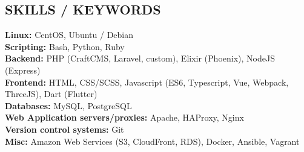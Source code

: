 \documentclass[margin,line]{resume}
\begin{document}
\begin{resume}
    \vspace{-1mm}

\sectionline

    \section{\mysidestyle \textbf{\large{S}\small{KILLS} / \large{K}\small{EYWORDS}}}

    \textbf{Linux:} CentOS, Ubuntu / Debian\\
    \textbf{Scripting:} Bash, Python, Ruby\\
    \textbf{Backend:} PHP (CraftCMS, Laravel, custom), Elixir (Phoenix), NodeJS (Express)\\
    \textbf{Frontend:} HTML, CSS/SCSS, Javascript (ES6, Typescript, Vue, Webpack, ThreeJS), Dart (Flutter)\\
    \textbf{Databases:} MySQL, PostgreSQL\\
    \textbf{Web Application servers/proxies:} Apache, HAProxy, Nginx\\
    \textbf{Version control systems:} Git\\
    \textbf{Misc:} Amazon Web Services (S3, CloudFront, RDS), Docker, Ansible, Vagrant



\end{resume}
\end{document}
